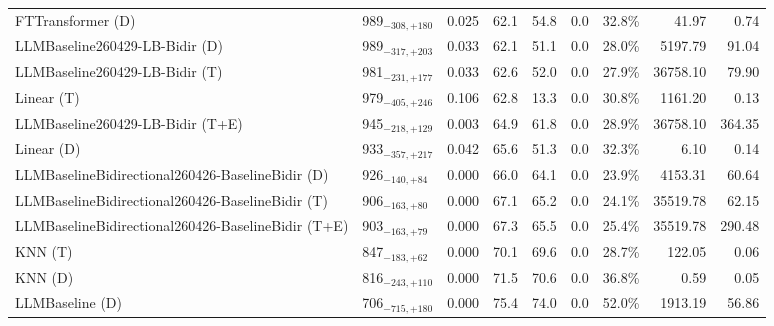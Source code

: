 \begin{tabular}{llcccccrr}
FTTransformer (D) & 989${}_{-308,+180}$ & 0.025 & 62.1 & 54.8 & 0.0 & 32.8\% & 41.97 & 0.74 \\
LLMBaseline260429-LB-Bidir (D) & 989${}_{-317,+203}$ & 0.033 & 62.1 & 51.1 & 0.0 & 28.0\% & 5197.79 & 91.04 \\
LLMBaseline260429-LB-Bidir (T) & 981${}_{-231,+177}$ & 0.033 & 62.6 & 52.0 & 0.0 & 27.9\% & 36758.10 & 79.90 \\
Linear (T) & 979${}_{-405,+246}$ & 0.106 & 62.8 & 13.3 & 0.0 & 30.8\% & 1161.20 & 0.13 \\
LLMBaseline260429-LB-Bidir (T+E) & 945${}_{-218,+129}$ & 0.003 & 64.9 & 61.8 & 0.0 & 28.9\% & 36758.10 & 364.35 \\
Linear (D) & 933${}_{-357,+217}$ & 0.042 & 65.6 & 51.3 & 0.0 & 32.3\% & 6.10 & 0.14 \\
LLMBaselineBidirectional260426-BaselineBidir (D) & 926${}_{-140,+84}$ & 0.000 & 66.0 & 64.1 & 0.0 & 23.9\% & 4153.31 & 60.64 \\
LLMBaselineBidirectional260426-BaselineBidir (T) & 906${}_{-163,+80}$ & 0.000 & 67.1 & 65.2 & 0.0 & 24.1\% & 35519.78 & 62.15 \\
LLMBaselineBidirectional260426-BaselineBidir (T+E) & 903${}_{-163,+79}$ & 0.000 & 67.3 & 65.5 & 0.0 & 25.4\% & 35519.78 & 290.48 \\
KNN (T) & 847${}_{-183,+62}$ & 0.000 & 70.1 & 69.6 & 0.0 & 28.7\% & 122.05 & 0.06 \\
KNN (D) & 816${}_{-243,+110}$ & 0.000 & 71.5 & 70.6 & 0.0 & 36.8\% & 0.59 & 0.05 \\
LLMBaseline (D) & 706${}_{-715,+180}$ & 0.000 & 75.4 & 74.0 & 0.0 & 52.0\% & 1913.19 & 56.86 \\
\bottomrule
\end{tabular}
